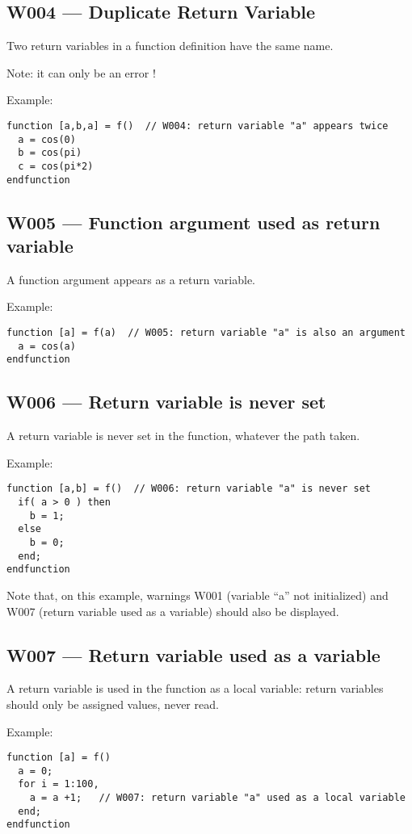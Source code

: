 \documentclass{article}
\begin{document}
\subsection{W004 --- Duplicate Return Variable}

Two return variables in a function definition have the same name.

Note: it can only be an error !

Example:
\begin{verbatim}
function [a,b,a] = f()  // W004: return variable "a" appears twice
  a = cos(0)
  b = cos(pi)
  c = cos(pi*2)
endfunction
\end{verbatim}

\subsection{W005 --- Function argument used as return variable}

A function argument appears as a return variable.

Example:
\begin{verbatim}
function [a] = f(a)  // W005: return variable "a" is also an argument
  a = cos(a)
endfunction
\end{verbatim}

\subsection{W006 --- Return variable is never set}

A return variable is never set in the function, whatever the path taken.

Example:
\begin{verbatim}
function [a,b] = f()  // W006: return variable "a" is never set
  if( a > 0 ) then
    b = 1;
  else
    b = 0;
  end;
endfunction
\end{verbatim}
Note that, on this example, warnings W001 (variable ``a'' not initialized)
and W007 (return variable used as a variable) should also be displayed.


\subsection{W007 --- Return variable used as a variable}

A return variable is used in the function as a local variable: return
variables should only be assigned values, never read. 

Example:
\begin{verbatim}
function [a] = f()
  a = 0;
  for i = 1:100,
    a = a +1;   // W007: return variable "a" used as a local variable
  end;
endfunction
\end{verbatim}
\end{document}

